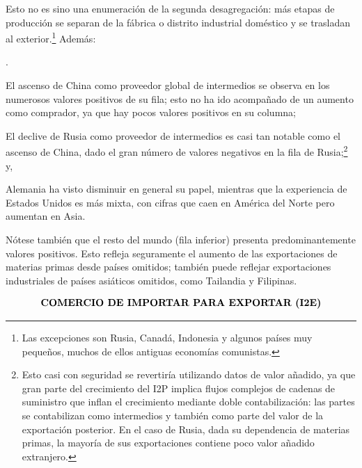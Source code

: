 \documentclass[10pt,a4paper]{article}
\newcounter{numitem}
\newenvironment{lnum}
      {\begin{list}{\arabic{numitem}.}{%
          \usecounter{numitem}%
          \setlength{\leftmargin}{1cm}%
          \setlength{\parskip}{3pt}%
          \setlength{\itemsep}{0pt}%
          \setlength{\parsep}{0pt}%
      }}
      {\end{list}}
\begin{document}
Esto no es sino una enumeración de la segunda desagregación: más etapas de producción se separan de la fábrica o distrito industrial doméstico y se trasladan al exterior.\footnote{%
    Las excepciones son Rusia, Canadá, Indonesia y algunos países muy pequeños, muchos de ellos antiguas economías comunistas.
} Además:
\begin{lnum}
    \item El ascenso de China como proveedor global de intermedios se observa en los numerosos valores positivos de su fila; esto no ha ido acompañado de un aumento como comprador, ya que hay pocos valores positivos en su columna;
    \item El declive de Rusia como proveedor de intermedios es casi tan notable como el ascenso de China, dado el gran número de valores negativos en la fila de Rusia;\footnote{%
        Esto casi con seguridad se revertiría utilizando datos de valor añadido, ya que gran parte del crecimiento del I2P implica flujos complejos de cadenas de suministro que inflan el crecimiento mediante doble contabilización: las partes se contabilizan como intermedios y también como parte del valor de la exportación posterior. En el caso de Rusia, dada su dependencia de materias primas, la mayoría de sus exportaciones contiene poco valor añadido extranjero.
    } y,
    \item Alemania ha visto disminuir en general su papel, mientras que la experiencia de Estados Unidos es más mixta, con cifras que caen en América del Norte pero aumentan en Asia.
\end{lnum}

Nótese también que el resto del mundo (fila inferior) presenta predominantemente valores positivos. Esto refleja seguramente el aumento de las exportaciones de materias primas desde países omitidos; también puede reflejar exportaciones industriales de países asiáticos omitidos, como Tailandia y Filipinas.

$$\text{\textbf{COMERCIO DE IMPORTAR PARA EXPORTAR (I2E)}}$$
\end{document}
